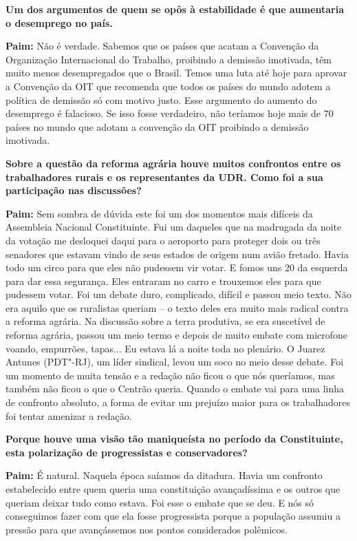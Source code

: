 \textbf{Um dos argumentos de quem se opôs à estabilidade é que
aumentaria o desemprego no país.}

\textbf{Paim:} Não é verdade. Sabemos que os países que acatam a
Convenção da Organização Internacional do Trabalho, proibindo a demissão
imotivada, têm muito menos desempregados que o Brasil. Temos uma luta
até hoje para aprovar a Convenção da OIT que recomenda que todos os
países do mundo adotem a política de demissão só com motivo justo. Esse
argumento do aumento do desemprego é falacioso. Se isso fosse
verdadeiro, não teríamos hoje mais de 70 países no mundo que adotam a
convenção da OIT proibindo a demissão imotivada.

\textbf{Sobre a questão da reforma agrária houve muitos confrontos entre
os trabalhadores rurais e os representantes da UDR. Como foi a sua
participação nas discussões?}

\textbf{Paim:} Sem sombra de dúvida este foi um dos momentos mais
difíceis da Assembleia Nacional Constituinte. Fui um daqueles que na
madrugada da noite da votação me desloquei daqui para o aeroporto para
proteger dois ou três senadores que estavam vindo de seus estados de
origem num avião fretado. Havia todo um circo para que eles não pudessem
vir votar. E fomos uns 20 da esquerda para dar essa segurança. Eles
entraram no carro e trouxemos eles para que pudessem votar. Foi um
debate duro, complicado, difícil e passou meio texto. Não era aquilo que
os ruralistas queriam -- o texto deles era muito mais radical contra a
reforma agrária. Na discussão sobre a terra produtiva, se era suscetível
de reforma agrária, passou um meio termo e depois de muito embate com
microfone voando, empurrões, tapas... Eu estava lá a noite toda no
plenário. O Juarez Antunes (PDT"-RJ), um líder sindical, levou um soco no
meio desse debate. Foi um momento de muita tensão e a redação não ficou
o que nós queríamos, mas também não ficou o que o Centrão queria. Quando
o embate vai para uma linha de confronto absoluto, a forma de evitar um
prejuízo maior para os trabalhadores foi tentar amenizar a redação.

\textbf{Porque houve uma visão tão maniqueísta no período da
Constituinte, esta polarização de progressistas e conservadores?}

\textbf{Paim:} É natural. Naquela época saíamos da ditadura. Havia um
confronto estabelecido entre quem queria uma constituição avançadíssima
e os outros que queriam deixar tudo como estava. Foi esse o embate que
se deu. E nós só conseguimos fazer com que ela fosse progressista porque
a população assumiu a pressão para que avançássemos nos pontos
considerados polêmicos.


